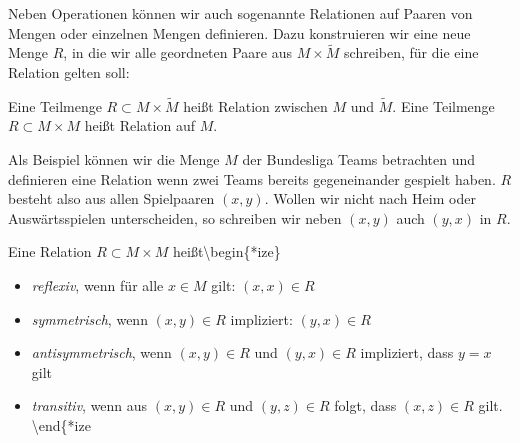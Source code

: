\documentclass[letterpaper,10pt,english]{jupyterBook}
\begin{document}
Neben Operationen können wir auch sogenannte Relationen auf Paaren von Mengen oder einzelnen Mengen definieren. Dazu konstruieren wir eine neue Menge \(R\), in die wir alle geordneten Paare aus \(M \times \tilde M\) schreiben, für die eine Relation gelten soll:
\label{grundlagen/mengenlogik:definition-3}
\begin{definition}{}{}



Eine Teilmenge \(R \subset M \times \tilde M\) heißt Relation zwischen \(M\) und \(\tilde M\). Eine Teilmenge \(R \subset M \times M\) heißt Relation auf \(M\).
\end{definition}

Als Beispiel können wir die Menge \(M\) der Bundesliga Teams betrachten und definieren eine Relation wenn zwei Teams bereits gegeneinander gespielt haben. \(R\) besteht also aus allen Spielpaaren \((x,y)\). Wollen wir nicht nach Heim  oder Auswärtsspielen unterscheiden, so schreiben wir neben \((x,y)\) auch \((y,x)\) in \(R\).
\label{grundlagen/mengenlogik:definition-4}
\begin{definition}{}{}



Eine Relation \(R \subset M \times M\) heißt\textbackslash{}begin\{*ize\}
\begin{itemize}
\item {} 
\emph{reflexiv}, wenn für alle \(x \in M\) gilt: \((x,x) \in R\)

\item {} 
\emph{symmetrisch}, wenn \((x,y) \in R\) impliziert: \((y,x) \in R\)

\item {} 
\emph{antisymmetrisch}, wenn \((x,y) \in R\) und \((y,x) \in R\) impliziert, dass \(y=x\) gilt

\item {} 
\emph{transitiv}, wenn aus \((x,y) \in R\) und \((y,z) \in R\) folgt, dass \((x,z)  \in R\) gilt.
\textbackslash{}end\{*ize

\end{itemize}
\end{definition}
\end{document}
